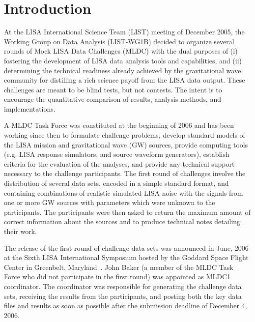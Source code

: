 \documentclass[12pt]{iopart}
\begin{document}

\section{Introduction}

At the LISA International Science Team (LIST) meeting of December 2005, the Working Group on Data Analysis (LIST-WG1B) decided to organize several rounds of Mock LISA Data Challenges (MLDC) with the dual purposes of (i) fostering the development of LISA data analysis tools and capabilities, and (ii) determining the technical readiness already achieved by the gravitational wave community for distilling a rich science payoff from the LISA data output. These challenges are meant to be blind tests, but not contests. The intent is to encourage the quantitative comparison of results, analysis methods, and implementations.

A MLDC Task Force was constituted at the beginning of 2006 and has been working since then to formulate challenge problems, develop standard models of the LISA mission and gravitational wave (GW) sources, provide computing tools (e.g. LISA response simulators, and source waveform generators), establish criteria for the evaluation of the analyses, and provide any technical support necessary to the challenge participants. The first round of challenges involve the distribution of several data sets, encoded in a simple standard format, and containing combinations of realistic simulated LISA noise with the signals from one or more GW sources with parameters which were unknown to the participants. The participants were then asked to return the maximum amount of correct information about the sources and to produce technical notes detailing their work.

The release of the first round of challenge data sets was announced in June, 2006 at the Sixth LISA International Symposium hosted by the Goddard Space Flight Center in Greenbelt, Maryland~\cite{MLDCLISA06a, MLDCLISA06b}. John Baker (a member of the MLDC Task Force who did not participate in the first round) was appointed as MLDC1 coordinator. The coordinator was responsible for generating the challenge data sets, receiving the results from the participants, and posting both the key data files and results as soon as possible after the submission deadline of December 4, 2006.
\end{document}
